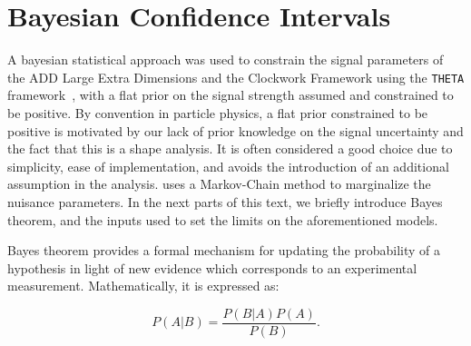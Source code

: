 \section{\label{sec:bayesian_inference} Bayesian Confidence Intervals}
A bayesian statistical approach was used to constrain the signal parameters of the ADD Large Extra Dimensions and the Clockwork Framework using the \texttt{THETA} framework~\cite{THETAFrameworkIntro}, with a flat prior on the signal strength assumed and constrained to be positive. By convention in particle physics, a flat prior constrained to be positive is motivated by our lack of prior knowledge on the signal uncertainty and the fact that this is a shape analysis. It is often considered a good choice due to simplicity, ease of implementation, and avoids the introduction of an additional assumption in the analysis. \THETA uses a Markov-Chain method to marginalize the nuisance parameters. In the next parts of this text, we briefly introduce Bayes theorem, and the inputs used to set the limits on the aforementioned models.


Bayes theorem provides a formal mechanism for updating the probability of a hypothesis in light of new evidence which corresponds to an experimental measurement. Mathematically, it is expressed as:

\begin{equation} \label{eq:Bayestheorem}
P(A|B) = \frac{P(B|A)P(A)}{P(B)}.
\end{equation}

